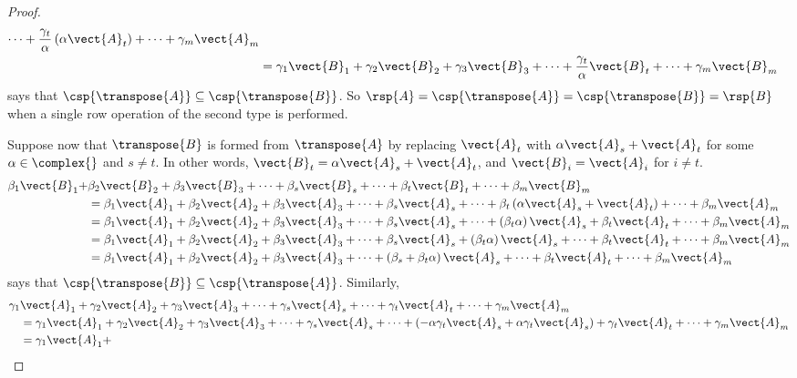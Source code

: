 \begin{proof}
\begin{align*}
\cdots+
\frac{\gamma_t}{\alpha}\left(\alpha\vect{A}_t\right)+
\cdots+
\gamma_m\vect{A}_m\\
%
&=
\gamma_1\vect{B}_1+
\gamma_2\vect{B}_2+
\gamma_3\vect{B}_3+
\cdots+
\frac{\gamma_t}{\alpha}\vect{B}_t+
\cdots+
\gamma_m\vect{B}_m
\end{align*}
%
says that $\csp{\transpose{A}}\subseteq\csp{\transpose{B}}$.   So $\rsp{A}=\csp{\transpose{A}}=\csp{\transpose{B}}=\rsp{B}$ when a single row operation of the second type is performed.\par
%
Suppose now that $\transpose{B}$ is formed from $\transpose{A}$ by replacing $\vect{A}_t$ with $\alpha\vect{A}_s+\vect{A}_t$ for some $\alpha\in\complex{\null}$ and $s\neq t$.  In other words, $\vect{B}_t=\alpha\vect{A}_s+\vect{A}_t$, and $\vect{B}_i=\vect{A}_i$ for $i\neq t$.
\begin{align*}
\beta_1\vect{B}_1+
&
\beta_2\vect{B}_2+
\beta_3\vect{B}_3+
\cdots+
\beta_s\vect{B}_s+
\cdots+
\beta_t\vect{B}_t+
\cdots+
\beta_m\vect{B}_m\\
%
&=
\beta_1\vect{A}_1+
\beta_2\vect{A}_2+
\beta_3\vect{A}_3+
\cdots+
\beta_s\vect{A}_s+
\cdots+
\beta_t\left(\alpha\vect{A}_s+\vect{A}_t\right)+
\cdots+
\beta_m\vect{A}_m\\
%
&=
\beta_1\vect{A}_1+
\beta_2\vect{A}_2+
\beta_3\vect{A}_3+
\cdots+
\beta_s\vect{A}_s+
\cdots+
\left(\beta_t\alpha\right)\vect{A}_s+\beta_t\vect{A}_t+
\cdots+
\beta_m\vect{A}_m\\
%
&=
\beta_1\vect{A}_1+
\beta_2\vect{A}_2+
\beta_3\vect{A}_3+
\cdots+
\beta_s\vect{A}_s+\left(\beta_t\alpha\right)\vect{A}_s+
\cdots+
\beta_t\vect{A}_t+
\cdots+
\beta_m\vect{A}_m\\
%
&=
\beta_1\vect{A}_1+
\beta_2\vect{A}_2+
\beta_3\vect{A}_3+
\cdots+
\left(\beta_s+\beta_t\alpha\right)\vect{A}_s+
\cdots+
\beta_t\vect{A}_t+
\cdots+
\beta_m\vect{A}_m
\end{align*}
%
says that $\csp{\transpose{B}}\subseteq\csp{\transpose{A}}$.  Similarly,
%
%
\begin{align*}
\gamma_1&\vect{A}_1+
\gamma_2\vect{A}_2+
\gamma_3\vect{A}_3+
\cdots+
\gamma_s\vect{A}_s+
\cdots+
\gamma_t\vect{A}_t+
\cdots+
\gamma_m\vect{A}_m\\
%
&=
\gamma_1\vect{A}_1+
\gamma_2\vect{A}_2+
\gamma_3\vect{A}_3+
\cdots+
\gamma_s\vect{A}_s+
\cdots+
\left(-\alpha\gamma_t\vect{A}_s + \alpha\gamma_t\vect{A}_s\right)+\gamma_t\vect{A}_t+
\cdots+
\gamma_m\vect{A}_m\\
%
&=
\gamma_1\vect{A}_1+

\end{align*}
\end{proof}
